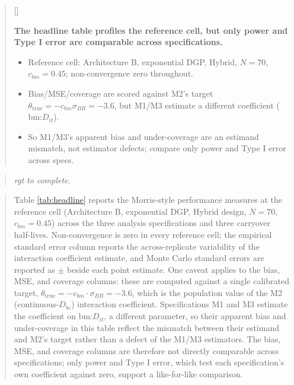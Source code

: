 \documentclass[
  11pt,
]{article}
\newcounter{pgraph}
\newenvironment{bullets}{%
  \stepcounter{pgraph}%
  \begin{quote}\small\sffamily\color[gray]{0.30}%
  {\normalfont\scriptsize\color[gray]{0.58}[\thepgraph]\enspace}}{%
  \end{quote}}
\newenvironment{rgt}{%
  \begin{quote}\small\itshape\color[RGB]{20,60,160}}{%
  \end{quote}}
\newenvironment{orig}{%
  \begin{quote}\normalsize\color[gray]{0.55}}{%
  \end{quote}}
\begin{document}
\begin{bullets}

\textbf{The headline table profiles the reference cell, but only
power and Type I error are comparable across specifications.}

\begin{itemize}\setlength{\itemsep}{2pt}\setlength{\parskip}{0pt}
\item Reference cell: Architecture B, exponential DGP, Hybrid,
$N = 70$, $c_{bm} = 0.45$; non-convergence zero throughout.
\item Bias/MSE/coverage are scored against M2's target
$\theta_{\text{true}} = -c_{bm}\sigma_{BR} = -3.6$, but M1/M3
estimate a different coefficient ($\text{bm:}D_{it}$).
\item So M1/M3's apparent bias and under-coverage are an
estimand mismatch, not estimator defects; compare only power and
Type I error across specs.
\end{itemize}

\end{bullets}

\begin{rgt}
rgt to complete.

\end{rgt}

\begin{orig}
Table \ref{tab:headline} reports the Morris-style performance
measures at the reference cell (Architecture B, exponential DGP,
Hybrid design, \(N = 70\), \(c_{bm} = 0.45\)) across the three
analysis specifications and three carryover half-lives.
Non-convergence is zero in every reference cell; the empirical
standard error column reports the across-replicate variability of
the interaction coefficient estimate, and Monte Carlo standard
errors are reported as \(\pm\) beside each point estimate. One
caveat applies to the bias, MSE, and coverage columns: these are
computed against a single calibrated target,
\(\theta_{\text{true}} = -c_{bm} \cdot \sigma_{BR} = -3.6\), which is
the population value of the M2 (continuous-\(D_{bc}\)) interaction
coefficient. Specifications M1 and M3 estimate the coefficient on
\(\text{bm:}D_{it}\), a different parameter, so their apparent bias
and under-coverage in this table reflect the mismatch between their
estimand and M2's target rather than a defect of the M1/M3
estimators. The bias, MSE, and coverage columns are therefore not
directly comparable across specifications; only power and Type I
error, which test each specification's own coefficient against
zero, support a like-for-like comparison.

\end{orig}
\end{document}
